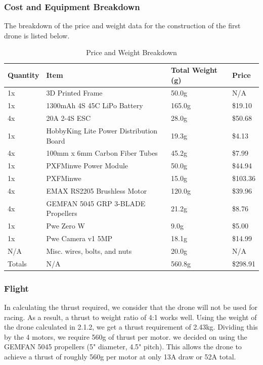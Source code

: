 \documentclass{article}
\begin{document}
\subsubsection{Cost and Equipment Breakdown}
The breakdown of the price and weight data for the construction of the first drone is listed below.
\begin{table}[h!]
\centering
\begin{tabular}{|l|l|l|l|}
\hline
Quantity & Item                                    & Total Weight (g) & Price    \\ \hline
1x       & 3D Printed Frame                        & 50.0g            & N/A      \\ \hline
1x       & 1300mAh 4S 45C LiPo Battery             & 165.0g           & \$19.10  \\ \hline
4x       & 20A 2-4S ESC                            & 28.0g            & \$50.68  \\ \hline
1x       & HobbyKing Lite Power Distribution Board & 19.3g            & \$4.13   \\ \hline
4x       & 100mm x 6mm Carbon Fiber Tubes          & 45.2g            & \$7.99   \\ \hline
1x       & PXFMinwe Power Module                    & 50.0g            & \$44.94  \\ \hline
1x       & PXFMinwe                                 & 15.0g            & \$103.36 \\ \hline
4x       & EMAX RS2205 Brushless Motor             & 120.0g           & \$39.96  \\ \hline
4x       & GEMFAN 5045 GRP 3-BLADE Propellers      & 21.2g            & \$8.76   \\ \hline
1x       & Pwe Zero W                               & 9.0g             & \$5.00   \\ \hline
1x       & Pwe Camera v1 5MP                        & 18.1g            & \$14.99  \\ \hline
N/A      & Misc. wires, bolts, and nuts            & 20.0g            & N/A      \\ \hline
Totals   & N/A                                     & 560.8g           & \$298.91 \\ \hline
\end{tabular}
\caption{Price and Weight Breakdown}
\end{table}

\subsubsection{Flight}
In calculating the thrust required, we consider that the drone will not be used for racing. As a result, a thrust to weight ratio of 4:1 works well. Using the weight of the drone calculated in 2.1.2, we get a thrust requirement of 2.43kg. Dividing this by the 4 motors, we require 560g of thrust per motor. we decided on using the GEMFAN 5045 propellers (5" diameter, 4.5" pitch). This allows the drone to achieve a thrust of roughly 560g per motor at only 13A draw or 52A total. 
\end{document}
